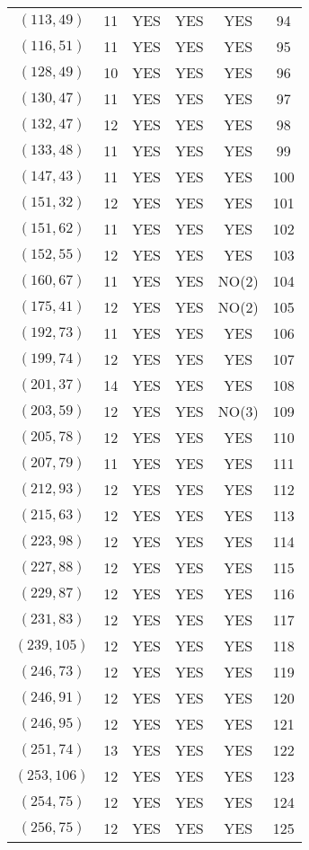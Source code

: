 \begin{longtable}{|c|c|c|c|c|c|}
$(113, 49)$ & 11 & YES & YES & YES & 94\\
$(116, 51)$ & 11 & YES & YES & YES & 95\\
$(128, 49)$ & 10 & YES & YES & YES & 96\\
$(130, 47)$ & 11 & YES & YES & YES & 97\\
$(132, 47)$ & 12 & YES & YES & YES & 98\\
$(133, 48)$ & 11 & YES & YES & YES & 99\\
$(147, 43)$ & 11 & YES & YES & YES & 100\\
$(151, 32)$ & 12 & YES & YES & YES & 101\\
$(151, 62)$ & 11 & YES & YES & YES & 102\\
$(152, 55)$ & 12 & YES & YES & YES & 103\\
$(160, 67)$ & 11 & YES & YES & NO(2) & 104\\
$(175, 41)$ & 12 & YES & YES & NO(2) & 105\\
$(192, 73)$ & 11 & YES & YES & YES & 106\\
$(199, 74)$ & 12 & YES & YES & YES & 107\\
$(201, 37)$ & 14 & YES & YES & YES & 108\\
$(203, 59)$ & 12 & YES & YES & NO(3) & 109\\
$(205, 78)$ & 12 & YES & YES & YES & 110\\
$(207, 79)$ & 11 & YES & YES & YES & 111\\
$(212, 93)$ & 12 & YES & YES & YES & 112\\
$(215, 63)$ & 12 & YES & YES & YES & 113\\
$(223, 98)$ & 12 & YES & YES & YES & 114\\
$(227, 88)$ & 12 & YES & YES & YES & 115\\
$(229, 87)$ & 12 & YES & YES & YES & 116\\
$(231, 83)$ & 12 & YES & YES & YES & 117\\
$(239, 105)$ & 12 & YES & YES & YES & 118\\
$(246, 73)$ & 12 & YES & YES & YES & 119\\
$(246, 91)$ & 12 & YES & YES & YES & 120\\
$(246, 95)$ & 12 & YES & YES & YES & 121\\
$(251, 74)$ & 13 & YES & YES & YES & 122\\
$(253, 106)$ & 12 & YES & YES & YES & 123\\
$(254, 75)$ & 12 & YES & YES & YES & 124\\
$(256, 75)$ & 12 & YES & YES & YES & 125\\

\end{longtable}
